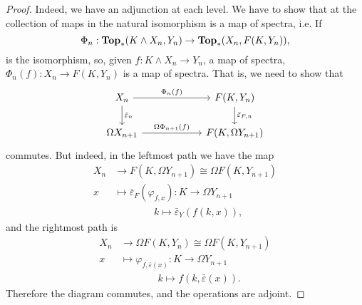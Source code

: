 \documentclass[a4paper,english,11pt]{article}
\theoremstyle{definition}
\theoremstyle{plain}
\theoremstyle{remark}
\newcommand{\Top}{\textbf{\text{Top}}}
\newcommand{\astruc}{\bar{\varepsilon}}
\begin{document}
\begin{proof}
  Indeed, we have an adjunction at each level. We have to show that at the collection of maps in the natural isomorphism is a map of spectra, i.e. If
  \[\Phi_n:\Top_\ast(K\wedge X_n,Y_n)\to \Top_\ast(X_n,F(K,Y_n)),\]
  is the isomorphism, so, given \(f:K\wedge X_n\to Y_n\), a map of spectra, \(\Phi_n(f):X_n\to F(K,Y_n)\) is a map of spectra. That is, we need to show that 
\begin{equation*}
    \begin{tikzcd}
      X_n\arrow{rr}{\Phi_n(f)}\arrow{d}{\astruc_n}&\ & F(K,Y_n)\arrow{d}{\astruc_{F,n}}\\
      \Omega X_{n+1}\arrow{rr}{\Omega\Phi_{n+1}(f)}&\ & F(K,\Omega Y_{n+1})
    \end{tikzcd}
\end{equation*}
commutes. But indeed, in the leftmost path we have the map
\begin{align*}
  X_n &\to F(K,\Omega Y_{n+1})\cong \Omega F(K,Y_{n+1}) \\
  x &\mapsto \astruc_F(\varphi_{f,x}):K\to \Omega Y_{n+1}\\
  &\ \ \ \ \ \ \ \ \ \ \ \ \ \ \ \ \ \ k \mapsto \astruc_{Y} (f(k,x)),
\end{align*}
and the rightmost path is 
\begin{align*}
  X_n &\to \Omega F(K,Y_n)\cong \Omega F(K,Y_{n+1}) \\
  x &\mapsto \varphi_{f,\astruc(x)}:K\to \Omega Y_{n+1}\\
  &\ \ \ \ \ \ \ \ \ \ \ \ \ \ \ \ \ k\mapsto f(k,\astruc(x)).
\end{align*}
Therefore the diagram commutes, and the operations are adjoint.


\end{proof}
\end{document}
